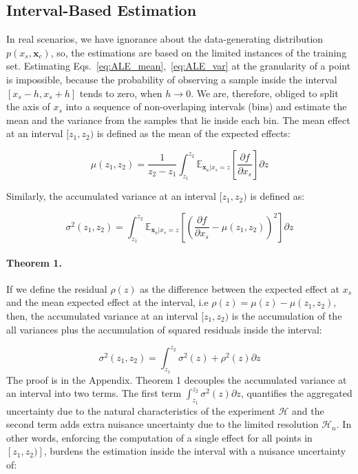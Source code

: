 \documentclass[twoside]{article}
\newcommand{\xc}{\mathbf{x_c}}
\begin{document}
\subsection{Interval-Based Estimation}
\label{sec:interval-based-estimation}

In real scenarios, we have ignorance about the data-generating
distribution \(p(x_s, \mathbf{x}_c)\), so, the estimations are based
on the limited instances of the training set. Estimating
Eqs.~\eqref{eq:ALE_mean},~\eqref{eq:ALE_var} at the granularity of a
point is impossible, because the probability of observing a sample
inside the interval \([x_s - h, x_s + h]\) tends to zero, when
\(h \to 0\). We are, therefore, obliged to split the axis of \(x_s\)
into a sequence of non-overlaping intervals (bins) and estimate the
mean and the variance from the samples that lie inside each bin. The
mean effect at an interval \([z_1, z_2)\) is defined as the mean of
the expected effects:

\begin{equation}
  \label{eq:mu_bin}
  \mu(z_1, z_2) = \frac{1}{z_2 - z_1} \int_{z_1}^{z_2}
  \mathbb{E}_{\xc|x_s=z}\left [\frac{\partial f}{\partial x_s} \right ] \partial z
\end{equation}

\noindent
Similarly, the accumulated variance at an interval \([z_1, z_2)\) is
defined as:

\begin{equation}
  \label{eq:var_bin}
  \sigma^2(z_1, z_2) = \int_{z_1}^{z_2}
  \mathbb{E}_{\xc|x_s=z} \left [ (\frac{\partial
      f}{\partial x_s} - \mu(z_1, z_2) )^2 \right] \partial z
\end{equation}
\paragraph{Theorem 1.} If we define the residual \(\rho(z)\) as the
difference between the expected effect at \(x_s\) and the mean
expected effect at the interval, i.e
\(\rho(z) = \mu(z) - \mu(z_1, z_2)\), then, the accumulated variance
at an interval \([z_1, z_2)\) is the accumulation of the all variances
plus the accumulation of squared residuals inside the interval:

\begin{equation}
 \sigma^2(z_1, z_2) = \int_{z_1}^{z_2} \sigma^2(z) + \rho^2(z) \partial z
\end{equation}
%
The proof is in the Appendix. Theorem 1 decouples the accumulated
variance at an interval into two terms. The first term
\(\int_{z_1}^{z_2} \sigma^2(z) \partial z\), quantifies the aggregated
uncertainty due to the natural characteristics of the experiment
\(\mathcal{H}\) and the second term adds extra nuisance uncertainty
due to the limited resolution \(\mathcal{H}_n\). In other words,
enforcing the computation of a single effect for all points in
\([z_1, z_2)]\), burdens the estimation inside the interval with a
nuisance uncertainty of:
\end{document}
